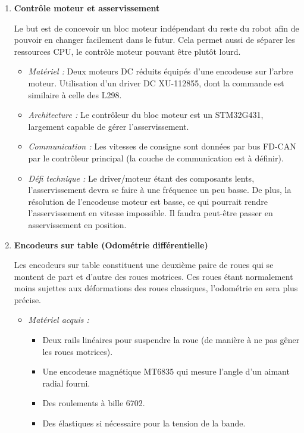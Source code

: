\documentclass[a4paper,10pt]{article}
\begin{document}
\begin{enumerate}
    \item \textbf{Contrôle moteur et asservissement}

    Le but est de concevoir un bloc moteur indépendant du reste du robot afin de pouvoir en changer facilement dans le futur. Cela permet aussi de séparer les ressources CPU, le contrôle moteur pouvant être plutôt lourd.

    \begin{itemize}
        \item \textit{Matériel :} Deux moteurs DC réduits équipés d'une encodeuse sur l'arbre moteur. Utilisation d'un driver DC XU-112855, dont la commande est similaire à celle des L298.
        \item \textit{Architecture :} Le contrôleur du bloc moteur est un STM32G431, largement capable de gérer l'asservissement.
        \item \textit{Communication :} Les vitesses de consigne sont données par bus FD-CAN par le contrôleur principal (la couche de communication est à définir).
        \item \textit{Défi technique :} Le driver/moteur étant des composants lents, l'asservissement devra se faire à une fréquence un peu basse. De plus, la résolution de l'encodeuse moteur est basse, ce qui pourrait rendre l'asservissement en vitesse impossible. Il faudra peut-être passer en asservissement en position.
    \end{itemize}

    \item \textbf{Encodeurs sur table (Odométrie différentielle)}

    Les encodeurs sur table constituent une deuxième paire de roues qui se montent de part et d'autre des roues motrices. Ces roues étant normalement moins sujettes aux déformations des roues classiques, l'odométrie en sera plus précise.

    \begin{itemize}
        \item \textit{Matériel acquis :}
        \begin{itemize}
            \item Deux rails linéaires pour suspendre la roue (de manière à ne pas gêner les roues motrices).
            \item Une encodeuse magnétique MT6835 qui mesure l'angle d'un aimant radial fourni.
            \item Des roulements à bille 6702.
            \item Des élastiques si nécessaire pour la tension de la bande.
        \end{itemize}
    \end{itemize}


\end{enumerate}
\end{document}
